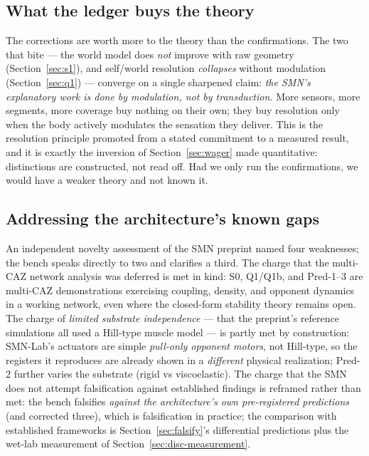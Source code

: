 \documentclass[utf8]{FrontiersinHarvard} %
\begin{document}
\subsection{What the ledger buys the theory}\label{sec:disc-ledger}
The corrections are worth more to the theory than the confirmations. The two that bite --- the world model does \emph{not} improve with raw geometry (Section~\ref{sec:s1}), and self/world resolution \emph{collapses} without modulation (Section~\ref{sec:q1}) --- converge on a single sharpened claim: \emph{the SMN's explanatory work is done by modulation, not by transduction.} More sensors, more segments, more coverage buy nothing on their own; they buy resolution only when the body actively modulates the sensation they deliver. This is the resolution principle promoted from a stated commitment to a measured result, and it is exactly the inversion of Section~\ref{sec:wager} made quantitative: distinctions are constructed, not read off. Had we only run the confirmations, we would have a weaker theory and not known it.

\subsection{Addressing the architecture's known gaps}\label{sec:disc-gaps}
An independent novelty assessment of the SMN preprint named four weaknesses; the bench speaks directly to two and clarifies a third. The charge that the multi-CAZ network analysis was deferred is met in kind: S0, Q1/Q1b, and Pred-1--3 are multi-CAZ demonstrations exercising coupling, density, and opponent dynamics in a working network, even where the closed-form stability theory remains open. The charge of \emph{limited substrate independence} --- that the preprint's reference simulations all used a Hill-type muscle model --- is partly met by construction: SMN-Lab's actuators are simple \emph{pull-only opponent motors}, not Hill-type, so the registers it reproduces are already shown in a \emph{different} physical realization; Pred-2 further varies the substrate (rigid vs viscoelastic). The charge that the SMN does not attempt falsification against established findings is reframed rather than met: the bench falsifies \emph{against the architecture's own pre-registered predictions} (and corrected three), which is falsification in practice; the comparison with established frameworks is Section~\ref{sec:falsify}'s differential predictions plus the wet-lab measurement of Section~\ref{sec:disc-measurement}.
\end{document}
